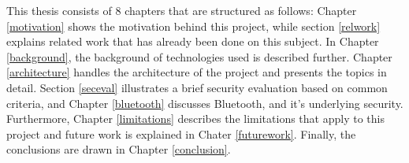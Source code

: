 This thesis consists of 8 chapters that are structured as follows: Chapter \ref{motivation} shows the motivation behind this project, while section \ref{relwork} explains related work that has already been done on this subject. In Chapter \ref{background}, the background of technologies used is described further. Chapter \ref{architecture} handles the architecture of the project and presents the topics in detail. Section \ref{seceval} illustrates a brief security evaluation based on common criteria, and Chapter \ref{bluetooth} discusses Bluetooth, and it's underlying security. Furthermore, Chapter \ref{limitations} describes the limitations that apply to this project and future work is explained in Chater \ref{futurework}. Finally, the conclusions are drawn in Chapter \ref{conclusion}.

